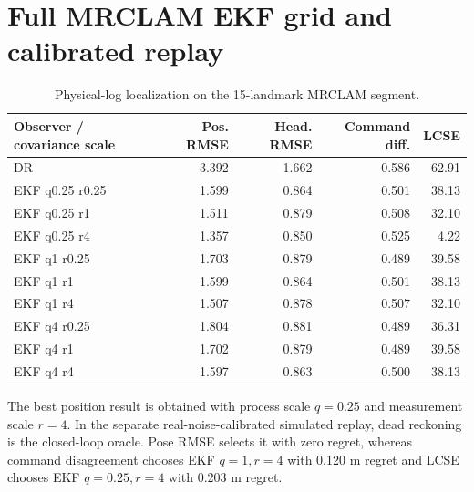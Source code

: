 \documentclass{article}
\begin{document}
\section{Full MRCLAM EKF grid and calibrated replay}
\begin{table}[h]
\centering
\caption{Physical-log localization on the 15-landmark MRCLAM segment.}
\label{tab:mr_grid}
\scriptsize
\begin{tabular}{lrrrr}
\toprule
Observer / covariance scale & Pos. RMSE & Head. RMSE & Command diff. & LCSE\\
\midrule
DR & 3.392 & 1.662 & 0.586 & 62.91 \\
EKF q0.25 r0.25 & 1.599 & 0.864 & 0.501 & 38.13 \\
EKF q0.25 r1 & 1.511 & 0.879 & 0.508 & 32.10 \\
EKF q0.25 r4 & 1.357 & 0.850 & 0.525 & 4.22 \\
EKF q1 r0.25 & 1.703 & 0.879 & 0.489 & 39.58 \\
EKF q1 r1 & 1.599 & 0.864 & 0.501 & 38.13 \\
EKF q1 r4 & 1.507 & 0.878 & 0.507 & 32.10 \\
EKF q4 r0.25 & 1.804 & 0.881 & 0.489 & 36.31 \\
EKF q4 r1 & 1.702 & 0.879 & 0.489 & 39.58 \\
EKF q4 r4 & 1.597 & 0.863 & 0.500 & 38.13 \\
\bottomrule
\end{tabular}
\end{table}
The best position result is obtained with process scale $q=0.25$ and measurement scale $r=4$. In the separate real-noise-calibrated simulated replay, dead reckoning is the closed-loop oracle. Pose RMSE selects it with zero regret, whereas command disagreement chooses EKF $q=1,r=4$ with 0.120 m regret and LCSE chooses EKF $q=0.25,r=4$ with 0.203 m regret.
\end{document}
